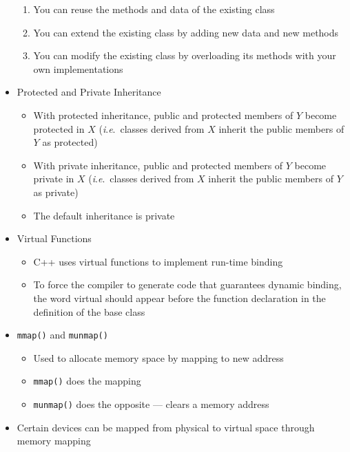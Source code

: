 \begin{itemize}
\begin{enumerate}
      \item You can reuse the methods and data of the existing class

      \item You can extend the existing class by adding new data and new methods

      \item You can modify the existing class by overloading its methods with your own implementations

    \end{enumerate}

  \item Protected and Private Inheritance

    \begin{itemize}

      \item With protected inheritance, public and protected members of $Y$ become protected in $X$ (\textit{i}.\textit{e}.\ classes derived from $X$ inherit the public members of $Y$ as protected)

      \item With private inheritance, public and protected members of $Y$ become private in $X$ (\textit{i}.\textit{e}.\ classes derived from $X$ inherit the public members of $Y$ as private)

      \item The default inheritance is private

    \end{itemize}

  \item Virtual Functions

    \begin{itemize}

      \item C++ uses virtual functions to implement run-time binding

      \item To force the compiler to generate code that guarantees dynamic binding, the word virtual should appear before the function declaration in the definition of the base class

    \end{itemize}

  \item \texttt{mmap()} and \texttt{munmap()}

    \begin{itemize}

      \item Used to allocate memory space by mapping to new address

      \item \texttt{mmap()} does the mapping

      \item \texttt{munmap()} does the opposite — clears a memory address

    \end{itemize}

  \item Certain devices can be mapped from physical to virtual space through memory mapping

\end{itemize}



